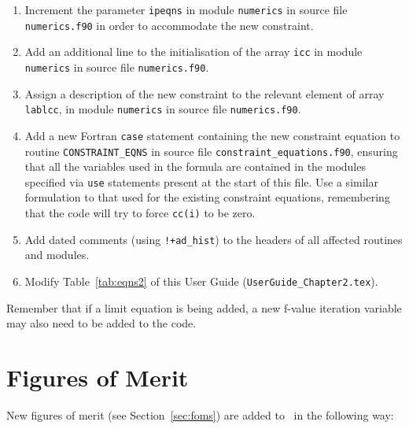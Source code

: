 \begin{enumerate}

\item Increment the parameter \texttt{ipeqns} in module \texttt{numerics} in
  source file \texttt{numerics.f90} in order to accommodate the new constraint.

\item Add an additional line to the initialisation of the array \texttt{icc}
  in module \texttt{numerics} in source file \texttt{numerics.f90}.

\item Assign a description of the new constraint to the relevant element of
  array \texttt{lablcc}, in module \texttt{numerics} in source file
  \texttt{numerics.f90}.

\item Add a new Fortran \texttt{case} statement containing the new constraint
  equation to routine \texttt{CONSTRAINT\_EQNS} in source file
  \texttt{constraint\_equations.f90}, ensuring that all the variables used in
  the formula are contained in the modules specified via \texttt{use}
  statements present at the start of this file.  Use a similar formulation to
  that used for the existing constraint equations, remembering that the code
  will try to force \texttt{cc(i)} to be zero.

\item Add dated comments (using \verb.!+ad_hist.) to the headers of
  all affected routines and modules.

\item Modify Table~\ref{tab:eqns2} of this User Guide
  (\texttt{UserGuide\_Chapter2.tex}).

\end{enumerate}

Remember that if a limit equation is being added, a new f-value iteration
variable may also need to be added to the code.

\section{Figures of Merit}

New figures of merit (see Section~\ref{sec:foms}) are added to \process\ in
the following way:

